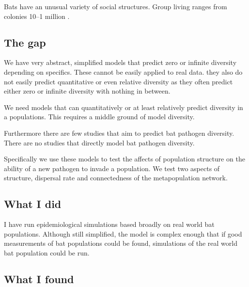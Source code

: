 Bats have an unusual variety of social structures.
Group living ranges from colonies 10--1 million \cite{jones2009pantheria}.



\subsection{The gap}

We have very abstract, simplified models that predict zero or infinite diversity depending on specifics.
These cannot be easily applied to real data.
they also do not easily predict quantitative or even relative diversity as they often predict either zero or infinite diversity with nothing in between.

We need models that can quantitatively or at least relatively predict diversity in a populations.
This requires a middle ground of model diversity.

Furthermore there are few studies that aim to predict bat pathogen diversity.
There are no studies that directly model bat pathogen diversity.

Specifically we use these models to test the affects of population structure on the ability of a new pathogen to invade a population.
We test two aspects of structure, dispersal rate and connectedness of the metapopulation network.


\subsection{What I did}


I have run epidemiological simulations based broadly on real world bat populations.
Although still simplified, the model is complex enough that if good measurements of bat populations could be found, simulations of the real world bat population could be run.




\subsection{What I found}


